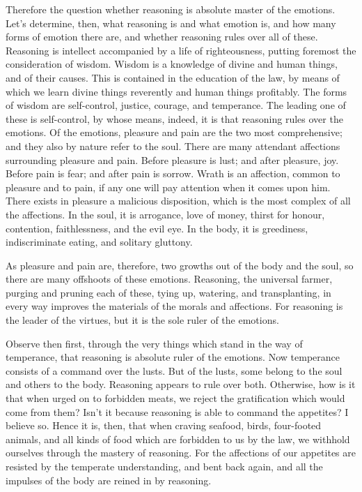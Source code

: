  Therefore the question whether reasoning is absolute
master of the emotions.  Let's determine, then, what
reasoning is and what emotion is, and how many forms of emotion there
are, and whether reasoning rules over all of these. 
Reasoning is intellect accompanied by a life of righteousness, putting
foremost the consideration of wisdom.  Wisdom is a
knowledge of divine and human things, and of their causes. 
This is contained in the education of the law, by means of which we
learn divine things reverently and human things profitably.
 The forms of wisdom are self-control, justice, courage,
and temperance.  The leading one of these is self-control,
by whose means, indeed, it is that reasoning rules over the emotions.
 Of the emotions, pleasure and pain are the two most
comprehensive; and they also by nature refer to the soul. 
There are many attendant affections surrounding pleasure and pain.
 Before pleasure is lust; and after pleasure, joy.
 Before pain is fear; and after pain is sorrow.
 Wrath is an affection, common to pleasure and to pain, if
any one will pay attention when it comes upon him.  There
exists in pleasure a malicious disposition, which is the most complex of
all the affections.  In the soul, it is arrogance, love of
money, thirst for honour, contention, faithlessness, and the evil eye.
 In the body, it is greediness, indiscriminate eating, and
solitary gluttony.

 As pleasure and pain are, therefore, two growths out of
the body and the soul, so there are many offshoots of these emotions.
 Reasoning, the universal farmer, purging and pruning each
of these, tying up, watering, and transplanting, in every way improves
the materials of the morals and affections.  For reasoning
is the leader of the virtues, but it is the sole ruler of the emotions.

Observe then first, through the very things which stand in the way of
temperance, that reasoning is absolute ruler of the emotions.
 Now temperance consists of a command over the lusts.
 But of the lusts, some belong to the soul and others to
the body. Reasoning appears to rule over both.  Otherwise,
how is it that when urged on to forbidden meats, we reject the
gratification which would come from them? Isn't it because reasoning is
able to command the appetites? I believe so.  Hence it is,
then, that when craving seafood, birds, four-footed animals, and all
kinds of food which are forbidden to us by the law, we withhold
ourselves through the mastery of reasoning.  For the
affections of our appetites are resisted by the temperate understanding,
and bent back again, and all the impulses of the body are reined in by
reasoning.


